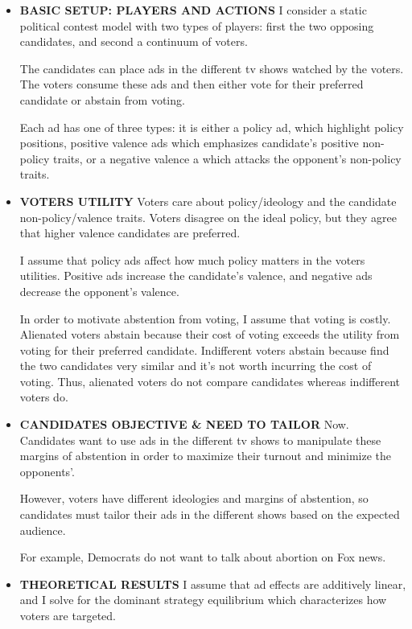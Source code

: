 \documentclass[12pt]{article}
\theoremstyle{plain}
\theoremstyle{plain}
\theoremstyle{plain}
\theoremstyle{plain}
\theoremstyle{plain}
\theoremstyle{plain}
\begin{document}
\begin{itemize}
\item \textbf{BASIC SETUP: PLAYERS AND ACTIONS}
I consider a static political contest model with two types of players:
first the two opposing candidates, and
second a continuum of voters.

The candidates can place ads in the different tv shows watched by the voters.
The voters consume these ads and then either vote for their preferred candidate or abstain from voting.

Each ad has one of three types:
it is either a policy ad, which highlight policy positions,
positive valence ads which emphasizes candidate's positive non-policy traits,
or a negative valence a which attacks the opponent's non-policy traits.

\item \textbf{VOTERS UTILITY}
Voters care about policy/ideology and the candidate non-policy/valence traits.
Voters disagree on the ideal policy, but they agree that higher valence candidates are preferred.

I assume that policy ads affect how much policy matters in the voters utilities.
Positive ads increase the candidate's valence, and negative ads decrease the opponent's valence.

In order to motivate abstention from voting, I assume that voting is costly.
Alienated voters abstain because their cost of voting exceeds the utility from voting for their preferred candidate.
Indifferent voters abstain because find the two candidates very similar and it's not worth incurring the cost of voting. 
Thus, alienated voters do not compare candidates whereas indifferent voters do.

\item \textbf{CANDIDATES OBJECTIVE \& NEED TO TAILOR}
Now.
Candidates want to use ads in the different tv shows to manipulate these margins of abstention
in order to maximize their turnout and minimize the opponents'.

However, voters have different ideologies and margins of abstention,
so candidates must tailor their ads in the different shows based on the expected audience.

For example, Democrats do not want to talk about abortion on Fox news.

\item \textbf{THEORETICAL RESULTS}
I assume that ad effects are additively linear,
and I solve for the dominant strategy equilibrium which characterizes how voters are targeted.


\end{itemize}
\end{document}
